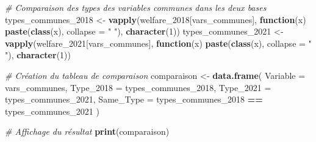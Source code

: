 \documentclass[
]{article}
\newenvironment{Shaded}{\begin{snugshade}}{\end{snugshade}}
\newcommand{\AttributeTok}[1]{\textcolor[rgb]{0.13,0.29,0.53}{#1}}
\newcommand{\CommentTok}[1]{\textcolor[rgb]{0.56,0.35,0.01}{\textit{#1}}}
\newcommand{\ControlFlowTok}[1]{\textcolor[rgb]{0.13,0.29,0.53}{\textbf{#1}}}
\newcommand{\DecValTok}[1]{\textcolor[rgb]{0.00,0.00,0.81}{#1}}
\newcommand{\FunctionTok}[1]{\textcolor[rgb]{0.13,0.29,0.53}{\textbf{#1}}}
\newcommand{\NormalTok}[1]{#1}
\newcommand{\OtherTok}[1]{\textcolor[rgb]{0.56,0.35,0.01}{#1}}
\newcommand{\SpecialCharTok}[1]{\textcolor[rgb]{0.81,0.36,0.00}{\textbf{#1}}}
\newcommand{\StringTok}[1]{\textcolor[rgb]{0.31,0.60,0.02}{#1}}
\begin{document}
\begin{Shaded}
\begin{Highlighting}[]
\CommentTok{\# Comparaison des types des variables communes dans les deux bases}
\NormalTok{types\_communes\_2018 }\OtherTok{\textless{}{-}} \FunctionTok{vapply}\NormalTok{(welfare\_2018[vars\_communes], }
                              \ControlFlowTok{function}\NormalTok{(x) }\FunctionTok{paste}\NormalTok{(}\FunctionTok{class}\NormalTok{(x), }
                              \AttributeTok{collapse =} \StringTok{" "}\NormalTok{), }\FunctionTok{character}\NormalTok{(}\DecValTok{1}\NormalTok{))}
\NormalTok{types\_communes\_2021 }\OtherTok{\textless{}{-}} \FunctionTok{vapply}\NormalTok{(welfare\_2021[vars\_communes], }
                              \ControlFlowTok{function}\NormalTok{(x) }\FunctionTok{paste}\NormalTok{(}\FunctionTok{class}\NormalTok{(x), }
                              \AttributeTok{collapse =} \StringTok{" "}\NormalTok{), }\FunctionTok{character}\NormalTok{(}\DecValTok{1}\NormalTok{))}

\CommentTok{\# Création du tableau de comparaison}
\NormalTok{comparaison }\OtherTok{\textless{}{-}} \FunctionTok{data.frame}\NormalTok{(}
  \AttributeTok{Variable =}\NormalTok{ vars\_communes,}
  \AttributeTok{Type\_2018 =}\NormalTok{ types\_communes\_2018,}
  \AttributeTok{Type\_2021 =}\NormalTok{ types\_communes\_2021,}
  \AttributeTok{Same\_Type =}\NormalTok{ types\_communes\_2018 }\SpecialCharTok{==}\NormalTok{ types\_communes\_2021}
\NormalTok{)}

\CommentTok{\# Affichage du résultat}
\FunctionTok{print}\NormalTok{(comparaison)}
\end{Highlighting}
\end{Shaded}
\end{document}
